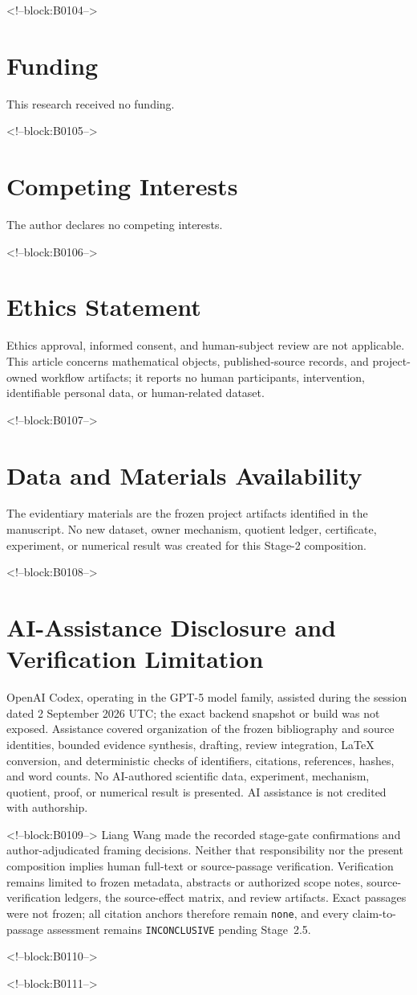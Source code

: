 \documentclass[11pt,a4paper]{article}
\begin{document}
<!--block:B0104-->
\section*{Funding}
This research received no funding.

<!--block:B0105-->
\section*{Competing Interests}
The author declares no competing interests.

<!--block:B0106-->
\section*{Ethics Statement}
Ethics approval, informed consent, and human-subject review are not applicable. This article concerns mathematical objects, published-source records, and project-owned workflow artifacts; it reports no human participants, intervention, identifiable personal data, or human-related dataset.

<!--block:B0107-->
\section*{Data and Materials Availability}
The evidentiary materials are the frozen project artifacts identified in the manuscript. No new dataset, owner mechanism, quotient ledger, certificate, experiment, or numerical result was created for this Stage-2 composition.

<!--block:B0108-->
\section*{AI-Assistance Disclosure and Verification Limitation}
OpenAI Codex, operating in the GPT-5 model family, assisted during the session dated 2 September 2026 UTC; the exact backend snapshot or build was not exposed. Assistance covered organization of the frozen bibliography and source identities, bounded evidence synthesis, drafting, review integration, LaTeX conversion, and deterministic checks of identifiers, citations, references, hashes, and word counts. No AI-authored scientific data, experiment, mechanism, quotient, proof, or numerical result is presented. AI assistance is not credited with authorship.

<!--block:B0109-->
Liang Wang made the recorded stage-gate confirmations and author-adjudicated framing decisions. Neither that responsibility nor the present composition implies human full-text or source-passage verification. Verification remains limited to frozen metadata, abstracts or authorized scope notes, source-verification ledgers, the source-effect matrix, and review artifacts. Exact passages were not frozen; all citation anchors therefore remain \texttt{none}, and every claim-to-passage assessment remains \texttt{INCONCLUSIVE} pending Stage~2.5.

<!--block:B0110-->



<!--block:B0111-->
\end{document}
